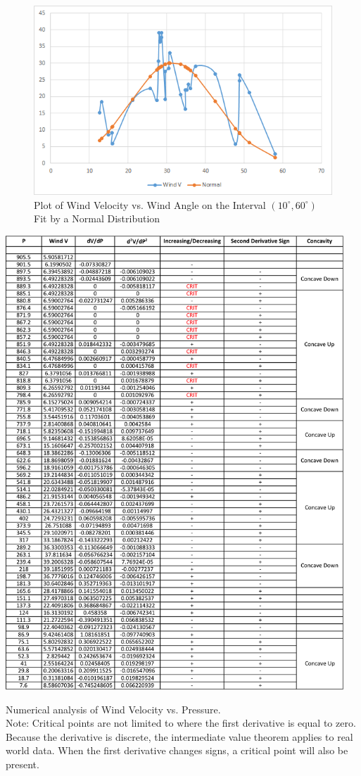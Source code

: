 \documentclass{journal}
\begin{document}
\begin{figure}[H]
  \centering
  \includegraphics[width=\textwidth]{alan-data-2.png}
  \caption{Plot of Wind Velocity vs. Wind Angle on the Interval $(10^{\circ}, 60^{\circ})$ Fit by a Normal Distribution}
\end{figure}

\appendix
\begin{table}[H]
\centering
\includegraphics[width=5in]{PANDA.png}
\caption{Numerical analysis of Wind Velocity vs. Pressure.  \\Note: Critical points are not limited to where the first derivative is equal to zero.  Because the derivative is discrete, the intermediate value theorem applies to real world data.  When the first derivative changes signs, a critical point will also be present. }
\end{table}
\end{document}
